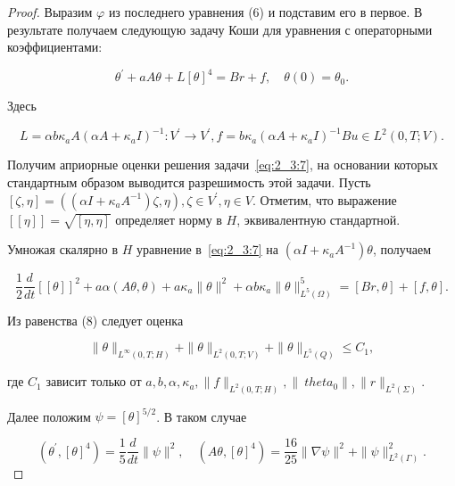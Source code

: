 \begin{proof}
    Выразим $\varphi$ из последнего уравнения (6) и подставим его в первое.
    В результате получаем следующую задачу Коши для уравнения с операторными коэффициентами:

    \begin{equation}
        \label{eq:2_3:7}
        \theta^{\prime}+a A \theta+L[\theta]^{4}=B r+f, \quad \theta(0)=\theta_{0}.
    \end{equation}

    Здесь

    \[
        L=\alpha b \kappa_{a} A\left(\alpha A+\kappa_{a} I\right)^{-1}: V^{\prime}
        \rightarrow V^{\prime}, f=b \kappa_{a}\left(\alpha A
        +\kappa_{a} I\right)^{-1} B u \in L^{2}(0, T ; V).
    \]

    Получим априорные оценки решения задачи~\eqref{eq:2_3:7},
    на основании которых стандартным образом выводится
    разрешимость этой задачи.
    Пусть $[\zeta, \eta]=\left(\left(\alpha I+\kappa_{a} A^{-1}\right) \zeta,
    \eta\right), \zeta \in V^{\prime}, \eta \in V$.
    Отметим, что выражение $[[\eta]]=\sqrt{[\eta, \eta]}$ определяет норму в $H$,
    эквивалентную стандартной.

    Умножая скалярно в $H$ уравнение в~\eqref{eq:2_3:7}
    на $\left(\alpha I+\kappa_{a} A^{-1}\right) \theta$, получаем

    \begin{equation}
        \label{eq:2_3:8}
        \frac{1}{2} \frac{d}{d t}[[\theta]]^{2}+a
        \alpha(A \theta, \theta)+a \kappa_{a}\|\theta\|^{2}+\alpha
        b \kappa_{a}\|\theta\|_{L^{5}(\Omega)}^{5}=[B r, \theta] + [f, \theta].
    \end{equation}

    Из равенства (8) следует оценка

    \begin{equation}
        \label{eq:2_3:9}
        \|\theta\|_{L^{\infty}(0, T ; H)}+\|\theta\|_{L^{2}(0, T ; V)}
        +\|\theta\|_{L^{5}(Q)} \leq C_{1},
    \end{equation}


    где $C_{1}$ зависит только от $a, b, \alpha, \kappa_{a},\|f\|_{L^{2}(0, T ; H)},
    \left\|\ theta_{0}\right\|,\|r\|_{L^{2}(\Sigma)}$.

    Далее положим $\psi=[\theta]^{5 / 2}$.
    В таком случае

    \[
        \left(\theta^{\prime},[\theta]^{4}\right)=\frac{1}{5} \frac{d}{d t}\|\psi\|^{2},
        \quad\left(A \theta,[\theta]^{4}\right)=\frac{16}{25}\|\nabla \psi\|^{2}
        +\|\psi\|_{L^{2}(\Gamma)}^{2}.
    \]


\end{proof}

